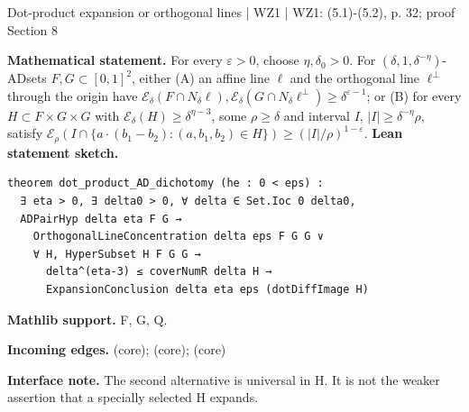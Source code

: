 \documentclass[10pt,a4paper]{article}
\newcommand{\nodecard}[1]{\hyperlink{node-#1}{\texttt{\detokenize{#1}}}}
\begin{document}
\begin{minipage}{\linewidth}
\hypertarget{node-T5_2}{}
\begin{tcolorbox}[colback=white,colframe=regularityfg,colbacktitle=regularitybg,coltitle=ink,boxrule=0.45pt,arc=1.6mm,left=3mm,right=3mm,top=2mm,bottom=2mm,title={\sffamily\bfseries WZ1 Theorem 5.2 \hfill \texttt{T5\_2}}]
{\sffamily\small\color{muted}Dot-product expansion or orthogonal lines | WZ1 | WZ1: (5.1)-(5.2), p. 32; proof Section 8}\par
\textbf{Mathematical statement.} For every $\varepsilon>0$, choose $\eta,\delta_0>0$.
For $(\delta,1,\delta^{-\eta})$-ADsets $F,G\subset[0,1]^2$, either
(A) an affine line $\ell$ and the orthogonal line $\ell^\perp$ through the origin have
$\mathcal E_\delta(F\cap N_\delta\ell),\mathcal E_\delta(G\cap N_\delta\ell^\perp)\ge\delta^{\varepsilon-1}$; or
(B) for every $H\subset F\times G\times G$ with $\mathcal E_\delta(H)\ge\delta^{\eta-3}$, some $\rho\ge\delta$ and interval $I$, $|I|\ge\delta^{-\eta}\rho$, satisfy
$\mathcal E_\rho(I\cap\{a\cdot(b_1-b_2):(a,b_1,b_2)\in H\})\ge(|I|/\rho)^{1-\varepsilon}$.
\smallskip\textbf{Lean statement sketch.}
\begin{Verbatim}[fontsize=\small,breaklines=true,breakanywhere=true,tabsize=2]
theorem dot_product_AD_dichotomy (he : 0 < eps) :
  ∃ eta > 0, ∃ delta0 > 0, ∀ delta ∈ Set.Ioc 0 delta0,
  ADPairHyp delta eta F G →
    OrthogonalLineConcentration delta eps F G G ∨
    ∀ H, HyperSubset H F G G →
      delta^(eta-3) ≤ coverNumR delta H →
      ExpansionConclusion delta eta eps (dotDiffImage H)
\end{Verbatim}
{\footnotesize\textbf{Mathlib support.} F, G, Q.\par
\textbf{Incoming edges.} \nodecard{T5_2p} (core); \nodecard{DFrost} (core); \nodecard{DAD} (core)\par}
{\footnotesize\textbf{Interface note.} The second alternative is universal in H. It is not the weaker assertion that a specially selected H expands.}
\end{tcolorbox}\end{minipage}\par\medskip
\end{document}
